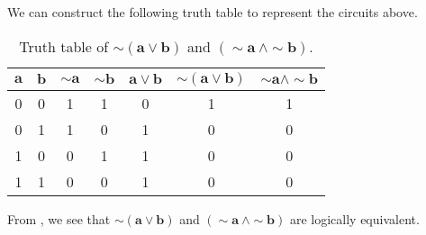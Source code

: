 \begin{subquestions}
\begin{subsubquestions}
\subsubquestion

We can construct the following truth table to represent the circuits above.
\begin{table}[h]
	\centering
	\begin{tabular}{|c|c|c|c|c|c|c|}
		\hline
		$\boldsymbol{a}$ & $\boldsymbol{b}$ & $\boldsymbol{\sim a}$ & $\boldsymbol{\sim b}$ & $\boldsymbol{a \lor b}$ & $\boldsymbol{\sim (a \lor b)}$ & $\boldsymbol{\sim a \land \sim b}$ \\
		\hline
		0 & 0 & 1 & 1 & 0 & 1 & 1 \\
		0 & 1 & 1 & 0 & 1 & 0 & 0 \\
		1 & 0 & 0 & 1 & 1 & 0 & 0 \\
		1 & 1 & 0 & 0 & 1 & 0 & 0 \\
		\hline
	\end{tabular}
	\caption{\label{2009:q2:tab:TruthTab2} Truth table of $\boldsymbol{\sim (a \lor b)}$ and $\boldsymbol{(\sim a ~\land \sim b)}$.}
\end{table}

From , we see that $\boldsymbol{\sim (a \lor b)}$ and $\boldsymbol{(\sim a ~\land \sim b)}$ are logically equivalent.

\end{subsubquestions}

\end{subquestions}


